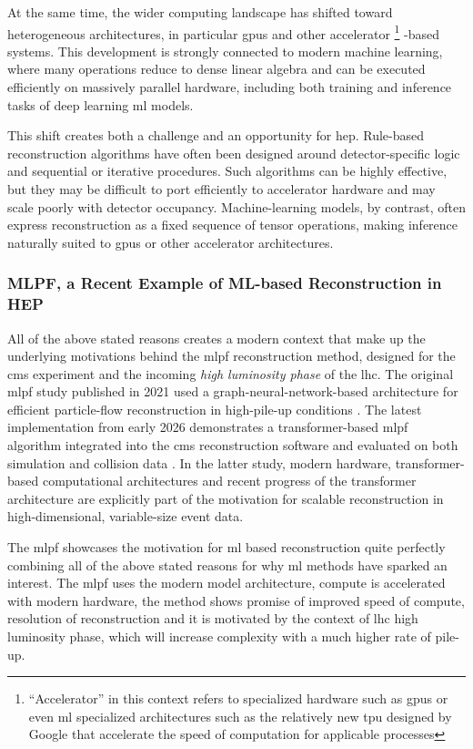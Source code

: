 At the same time, the wider computing landscape has shifted toward heterogeneous architectures, in particular \glspl{gpu} and other accelerator \footnote{``Accelerator'' in this context refers to specialized hardware such as \glspl{gpu} or even \gls{ml} specialized architectures such as the relatively new \gls{tpu} designed by Google that accelerate the speed of computation for applicable processes\cite{needed}}
-based systems. This development is strongly connected to modern machine learning, where many operations reduce to dense linear algebra and can be executed efficiently on massively parallel hardware, including both training and inference tasks of deep learning \gls{ml} models.

This shift creates both a challenge and an opportunity for \gls{hep}. Rule-based reconstruction algorithms have often been designed around detector-specific logic and sequential or iterative procedures. Such algorithms can be highly effective, but they may be difficult to port efficiently to accelerator hardware and may scale poorly with detector occupancy. Machine-learning models, by contrast, often express reconstruction as a fixed sequence of tensor operations, making inference naturally suited to \glspl{gpu} or other accelerator architectures. 

\subsubsection{MLPF, a Recent Example of ML-based Reconstruction in HEP}

All of the above stated reasons creates a modern context that make up the underlying motivations behind the \gls{mlpf} reconstruction method, designed for the \gls{cms} experiment and the incoming \textit{high luminosity phase} of the \gls{lhc}. The original \gls{mlpf} study published in 2021 used a graph-neural-network-based architecture for efficient particle-flow reconstruction in high-pile-up conditions \cite{pata2021-mlpf}. The latest implementation from early 2026 demonstrates a transformer-based \gls{mlpf} algorithm integrated into the \gls{cms} reconstruction software and evaluated on both simulation and collision data \cite{pata2026-mlpf}. In the latter study, modern hardware, transformer-based computational architectures and recent progress of  the transformer architecture are explicitly part of the motivation for scalable reconstruction in high-dimensional, variable-size event data.

The \gls{mlpf} showcases the motivation for \gls{ml} based reconstruction quite perfectly combining all of the above stated reasons for why \gls{ml} methods have sparked an interest. The \gls{mlpf} uses the modern model architecture, compute is accelerated with modern hardware, the method shows promise of improved speed of compute, resolution of reconstruction and it is motivated by the context of \gls{lhc} high luminosity phase, which will increase complexity with a much higher rate of pile-up.

